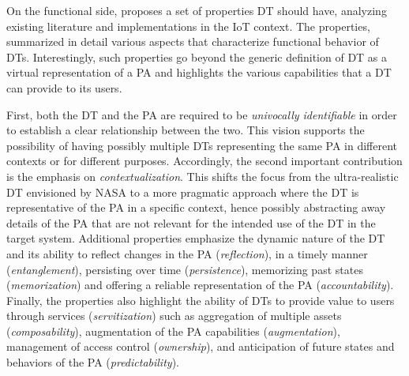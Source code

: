 On the functional side, \cite{dt-IoT-context-Minerva-2020} proposes a set of properties \ac{DT} should have, analyzing existing literature and implementations in the \ac{IoT} context.
%
The properties, summarized in  detail various aspects that characterize functional behavior of \acp{DT}.
%
Interestingly, such properties go beyond the generic definition of \ac{DT} as a virtual representation of a \ac{PA} and highlights the various capabilities that a \ac{DT} can provide to its users.

First, both the \ac{DT} and the \ac{PA} are required to be \emph{univocally identifiable} in order to establish a clear relationship between the two. This vision supports the possibility of having possibly multiple \acp{DT} representing the same \ac{PA} in different contexts or for different purposes.
%
Accordingly, the second important contribution is the emphasis on \emph{contextualization}. 
This shifts the focus from the ultra-realistic \ac{DT} envisioned by NASA to a more pragmatic approach where the \ac{DT} is representative of the \ac{PA} in a specific context,
hence possibly abstracting away details of the \ac{PA} that are not relevant for the intended use of the \ac{DT} in the target system.
%
Additional properties emphasize the dynamic nature of the \ac{DT} and its ability to reflect changes in the \ac{PA} (\emph{reflection}), in a timely manner (\emph{entanglement}), persisting over time (\emph{persistence}), memorizing past states (\emph{memorization}) and offering a reliable representation of the \ac{PA} (\emph{accountability}). 
%
Finally, the properties also highlight the ability of \acp{DT} to provide value to users through services (\emph{servitization}) such as aggregation of multiple assets (\emph{composability}), augmentation of the \ac{PA} capabilities (\emph{augmentation}), management of access control (\emph{ownership}), and anticipation of future states and behaviors of the \ac{PA} (\emph{predictability}).

